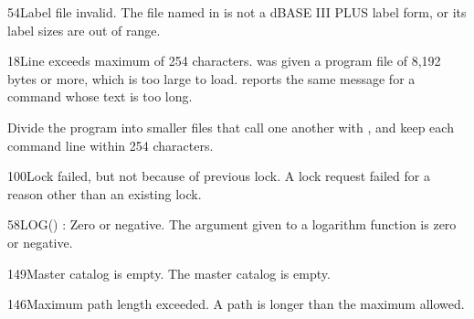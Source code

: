 \begin{XbaseMessageEntry}{54}{Label file invalid.}
The file named in  is not a dBASE III PLUS label form, or its label sizes are out of range.
\end{XbaseMessageEntry}

\begin{XbaseMessageEntry}{18}{Line exceeds maximum of 254 characters.}
 was given a program file of 8,192 bytes or more, which is too large to load.  reports the same message for a command whose text is too long.

Divide the program into smaller files that call one another with , and keep each command line within 254 characters.
\end{XbaseMessageEntry}

\begin{XbaseMessageEntry}{100}{Lock failed, but not because of previous lock.}
A lock request failed for a reason other than an existing lock.
\end{XbaseMessageEntry}

\begin{XbaseMessageEntry}{58}{LOG() : Zero or negative.}
The argument given to a logarithm function is zero or negative.
\end{XbaseMessageEntry}

\begin{XbaseMessageEntry}{149}{Master catalog is empty.}
The master catalog is empty.
\end{XbaseMessageEntry}

\begin{XbaseMessageEntry}{146}{Maximum path length exceeded.}
A path is longer than the maximum allowed.
\end{XbaseMessageEntry}

